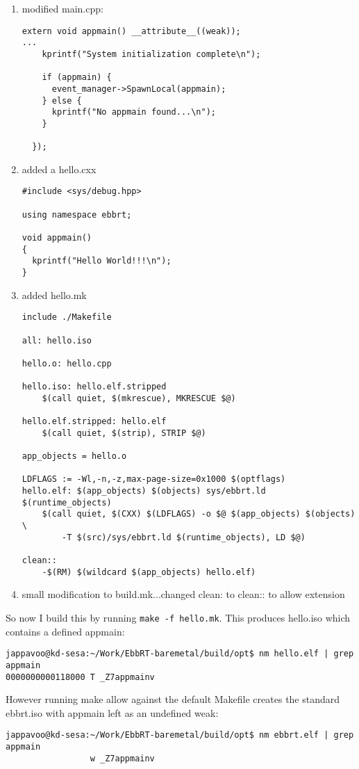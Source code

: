 \documentclass[11pt]{report}
\begin{document}
\begin{enumerate}
\item modified main.cpp:
\begin{verbatim}
extern void appmain() __attribute__((weak));
...
    kprintf("System initialization complete\n");

    if (appmain) {
      event_manager->SpawnLocal(appmain);
    } else {
      kprintf("No appmain found...\n");
    }

  });
\end{verbatim}
\item added a hello.cxx
\begin{verbatim}
#include <sys/debug.hpp>

using namespace ebbrt;

void appmain()
{
  kprintf("Hello World!!!\n"); 
}
\end{verbatim}
\item added hello.mk
\begin{verbatim}
include ./Makefile

all: hello.iso

hello.o: hello.cpp

hello.iso: hello.elf.stripped
	$(call quiet, $(mkrescue), MKRESCUE $@)

hello.elf.stripped: hello.elf
	$(call quiet, $(strip), STRIP $@)

app_objects = hello.o

LDFLAGS := -Wl,-n,-z,max-page-size=0x1000 $(optflags)
hello.elf: $(app_objects) $(objects) sys/ebbrt.ld $(runtime_objects)
	$(call quiet, $(CXX) $(LDFLAGS) -o $@ $(app_objects) $(objects) \
		-T $(src)/sys/ebbrt.ld $(runtime_objects), LD $@)

clean::
	-$(RM) $(wildcard $(app_objects) hello.elf)
\end{verbatim}
\item small modification to build.mk...changed clean: to clean:: to allow extension
\end{enumerate}

So now I build this by running {\tt make -f hello.mk}. This produces hello.iso
which contains a defined appmain:
\begin{verbatim}
jappavoo@kd-sesa:~/Work/EbbRT-baremetal/build/opt$ nm hello.elf | grep appmain
0000000000118000 T _Z7appmainv
\end{verbatim}
However running make allow against the default Makefile creates the standard ebbrt.iso with appmain left as an undefined weak:
\begin{verbatim}
jappavoo@kd-sesa:~/Work/EbbRT-baremetal/build/opt$ nm ebbrt.elf | grep appmain
                 w _Z7appmainv
\end{verbatim}
\end{document}
